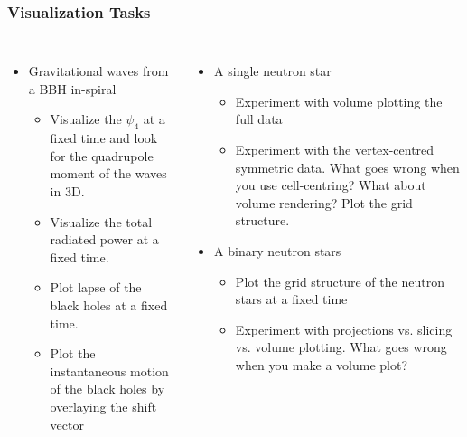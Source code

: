 \documentclass[]{beamer}
\begin{document}
\begin{frame}
  \frametitle{Visualization Tasks}
  \begin{columns}
    \column{5cm}
    \begin{itemize}
    \item Gravitational waves from a BBH in-spiral
      \begin{itemize}
      \item Visualize the $\psi_4$ at a fixed time and look for the
        quadrupole moment of the waves in 3D.
      \item Visualize the total radiated power at a fixed time.
      \item Plot lapse of the black holes at a fixed time.
      \item Plot the instantaneous motion of the black holes by
        overlaying the shift vector
      \end{itemize}
    \end{itemize}
    \column{7cm}
    \begin{itemize}
    \item A single neutron star
      \begin{itemize}
      \item Experiment with volume plotting the full data
      \item Experiment with the vertex-centred symmetric data. What
        goes wrong when you use cell-centring? What about volume
        rendering? Plot the grid structure.
      \end{itemize}
    \item A binary neutron stars
      \begin{itemize}
      \item Plot the grid structure of the neutron stars at a fixed
        time
      \item Experiment with projections vs. slicing vs. volume
        plotting. What goes wrong when you make a volume plot?
      \end{itemize}
    \end{itemize}
  \end{columns}
\end{frame}
\end{document}
